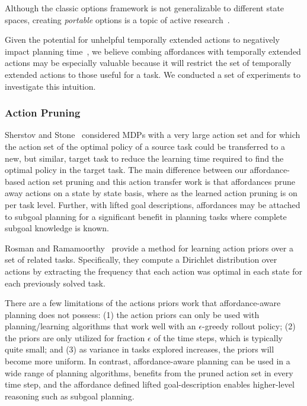 \documentclass[conference]{IEEEtran}
\begin{document}
Although the classic options framework is not generalizable to different state spaces,
creating {\em portable} options is a topic of active research~\cite{konidaris07,konidaris2009efficient,Ravindran03analgebraic,croonenborghs2008learning,andre2002state,konidaris2012transfer}.

Given the potential for unhelpful temporally extended actions to negatively impact planning time~\cite{Jong:2008zr}, we believe combing affordances with temporally extended actions
may be especially valuable because it will restrict the set of temporally extended actions to those
useful for a task. We conducted a set of experiments to investigate this intuition.

\subsubsection{Action Pruning}

Sherstov and Stone~\cite{sherstov2005improving} considered MDPs with a very large action set and for which the action
set of the optimal policy of a source task could be transferred to a new, but similar, target
task to reduce the learning time required to find the optimal policy in the target task. The main difference between our affordance-based action set pruning and this action transfer
work is that affordances prune away actions on a state by state basis, where
as the learned action pruning is on per task level. Further, with lifted goal descriptions, affordances may be attached to subgoal planning for a significant
benefit in planning tasks where complete subgoal knowledge is known.

Rosman and Ramamoorthy~\cite{rosman2012good} provide a method for learning action priors over a set of related tasks. Specifically, they compute a Dirichlet distribution over actions by extracting the frequency that each action was optimal in each state for each previously solved task.

There are a few limitations of the actions priors work that affordance-aware planning does not possess: (1) the action priors can only be used with planning/learning algorithms that work well with an $\epsilon$-greedy rollout policy; (2) the priors are only utilized for fraction $\epsilon$ of the time steps, which is typically quite small; and (3) as variance in tasks explored increases, the priors will become more uniform. In contrast, affordance-aware planning can be used in a wide range of planning algorithms, benefits from the pruned action set in every time step, and the affordance defined lifted goal-description enables higher-level reasoning such as subgoal planning.
\end{document}
